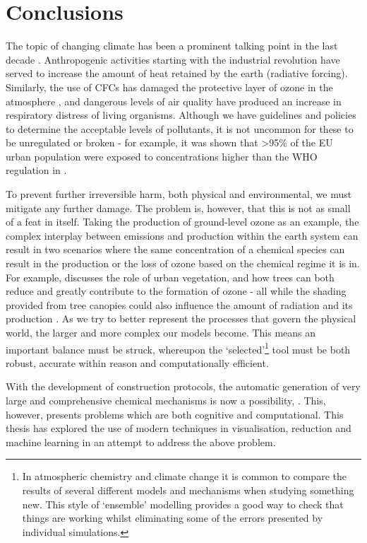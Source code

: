 \section{Conclusions}

The topic of changing climate has been a prominent talking point in the last decade \citep{IPCC2013Science}. Anthropogenic activities starting with the industrial revolution have served to increase the amount of heat retained by the earth (radiative forcing). Similarly, the use of CFCs has damaged the protective layer of ozone in the atmosphere \citep{o3damage}, and dangerous levels of air quality have produced an increase in respiratory distress of living organisms. Although we have guidelines and policies to determine the acceptable levels of pollutants, it is not uncommon for these to be unregulated or broken - for example, it was shown that >95\% of the EU urban population were exposed to concentrations higher than the WHO regulation in \citep{eea}.

To prevent further irreversible harm, both physical and environmental, we must mitigate any further damage. The problem is, however, that this is not as small of a feat in itself. Taking the production of ground-level ozone as an example, the complex interplay between emissions and production within the earth system can result in two scenarios where the same concentration of a chemical species can result in the production or the loss of ozone based on the chemical regime it is in. For example, \cite{reviewo3} discusses the role of urban vegetation, and how trees can both reduce \citep{losso3} and greatly contribute to the formation \citep{isopmcm} of ozone - all while the shading provided from tree canopies could also influence the amount of radiation and its production \citep{shady}. As we try to better represent the processes that govern the physical world, the larger and more complex our models become. This means an important balance must be struck, whereupon the `selected'\footnote{In atmospheric chemistry and climate change it is common to compare the results of several different models and mechanisms when studying something new. This style of `ensemble' modelling provides a good way to check that things are working whilst eliminating some of the errors presented by individual simulations.} tool must be both robust, accurate within reason and computationally efficient.

With the development of construction protocols, the automatic generation of very large and comprehensive chemical mechanisms is now a possibility, \citep{gecko}. This, however, presents problems which are both cognitive and computational. This thesis has explored the use of modern techniques in visualisation, reduction and machine learning in an attempt to address the above problem.

